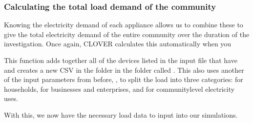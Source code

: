 \documentclass[letterpaper,10pt,english]{sphinxmanual}
\begin{document}
\subsubsection{Calculating the total load demand of the community}
\label{\detokenize{load:calculating-the-total-load-demand-of-the-community}}
\sphinxAtStartPar
Knowing the electricity demand of each appliance allows us to combine
these to give the total electricity demand of the entire community over
the duration of the investigation. Once again, CLOVER calculates this
automatically when you 

\begin{sphinxVerbatim}[commandchars=\\\{\}]
\end{sphinxVerbatim}

\sphinxAtStartPar
This function adds together all of the devices listed in the 
input file that have  and creates a new CSV in the
 folder in the  folder called .
This also uses another of the input parameters from before, , to
split the load into three categories:  for households,
 for businesses and enterprises, and  for
community\sphinxhyphen{}level electricity uses.

\sphinxAtStartPar
With this, we now have the necessary load data to input into our
simulations.
\end{document}
